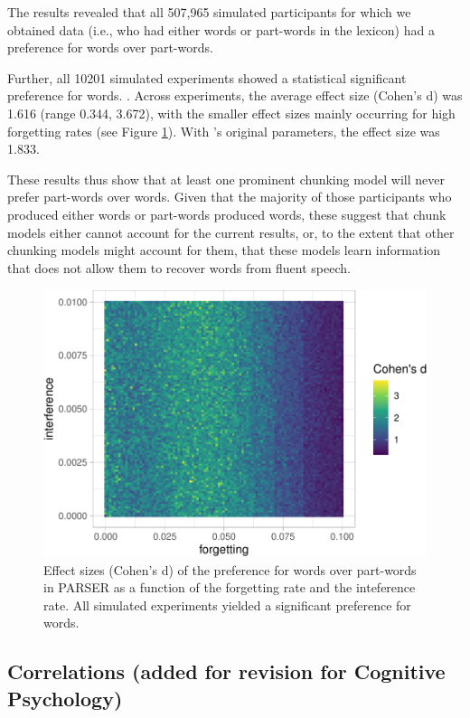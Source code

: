 \documentclass[
]{article}
\begin{document}
The results revealed that all 507,965 simulated participants for which
we obtained data (i.e., who had either words or part-words in the
lexicon) had a preference for words over part-words.

Further, all 10201 simulated experiments showed a statistical
significant preference for words. . Across experiments, the average
effect size (Cohen's d) was 1.616 (range 0.344, 3.672), with the smaller
effect sizes mainly occurring for high forgetting rates (see Figure
\ref{fig:parser-plot-d}). With \citep{Perruchet1998}'s original
parameters, the effect size was 1.833.

These results thus show that at least one prominent chunking model will
never prefer part-words over words. Given that the majority of those
participants who produced either words or part-words produced words,
these suggest that chunk models either cannot account for the current
results, or, to the extent that other chunking models might account for
them, that these models learn information that does not allow them to
recover words from fluent speech.

\begin{figure}

{\centering \includegraphics[width=0.8\linewidth]{segmentation_recall_combined_for_revision4_files/figure-latex/parser-plot-d-1} 

}

\caption{Effect sizes (Cohen's d) of the preference for words over part-words in PARSER as a function of the forgetting rate and the inteference rate. All simulated experiments yielded a significant preference for words.}\label{fig:parser-plot-d}
\end{figure}

\clearpage

\subsection{Correlations (added for revision for Cognitive
Psychology)}\label{correlations-added-for-revision-for-cognitive-psychology}
\end{document}
